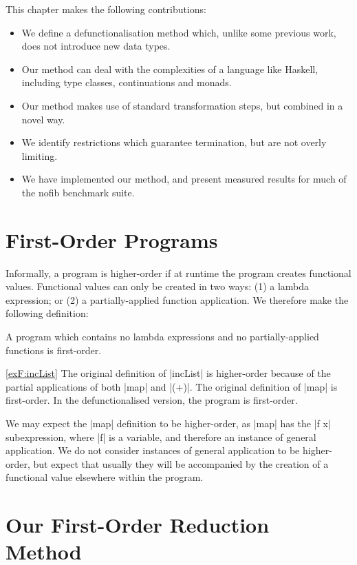 This chapter makes the following contributions:

\begin{itemize}
\item We define a defunctionalisation method which, unlike some previous work, does not introduce new data types.
\item Our method can deal with the complexities of a language like Haskell, including type classes, continuations and monads.
\item Our method makes use of standard transformation steps, but combined in a novel way.
\item We identify restrictions which guarantee termination, but are not overly limiting.
\item We have implemented our method, and present measured results for much of the nofib benchmark suite.
\end{itemize}

\section{First-Order Programs}
\label{secF:first_order}

Informally, a program is higher-order if at runtime the program creates functional values. Functional values can only be created in two ways: (1) a lambda expression; or (2) a partially-applied function application. We therefore make the following definition:

\begin{definition}
A program which contains no lambda expressions and no partially-applied functions is first-order.
\end{definition}

\begin{examplerevisit}{\ref{exF:incList}}
The original definition of |incList| is higher-order because of the partial applications of both |map| and |(+)|. The original definition of |map| is first-order. In the defunctionalised version, the program is first-order.
\end{examplerevisit}

We may expect the |map| definition to be higher-order, as |map| has the |f x| subexpression, where |f| is a variable, and therefore an instance of general application. We do not consider instances of general application to be higher-order, but expect that usually they will be accompanied by the creation of a functional value elsewhere within the program.

\section{Our First-Order Reduction Method}
\label{secF:overview}

